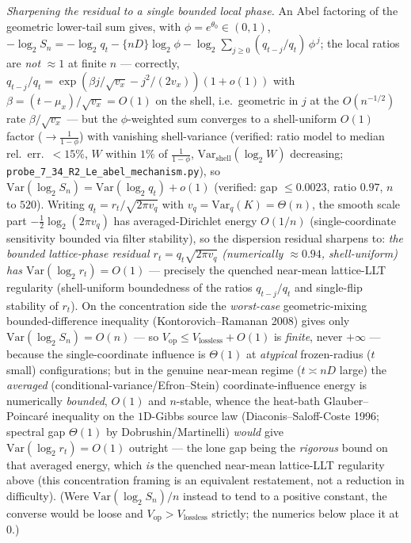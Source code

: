 \documentclass[
]{article}
\begin{document}
\emph{Sharpening the residual to a single bounded local phase.} An Abel factoring of the geometric
lower-tail sum gives, with $\phi=e^{\theta_0}\in(0,1)$,
$-\log_2 S_n=-\log_2 q_t-\{nD\}\log_2\phi-\log_2\!\sum_{j\ge0}(q_{t-j}/q_t)\,\phi^{\,j}$; the local
ratios are \emph{not} $\approx1$ at finite $n$ --- correctly, $q_{t-j}/q_t=\exp(\beta j/\sqrt{v_x}
-j^2/(2v_x))(1+o(1))$ with $\beta=(t-\mu_x)/\sqrt{v_x}=O(1)$ on the shell, i.e.\ geometric in $j$ at the
$O(n^{-1/2})$ rate $\beta/\sqrt{v_x}$ --- but the $\phi$-weighted sum converges to a shell-uniform
$O(1)$ factor ($\to\frac1{1-\phi}$) with vanishing shell-variance (verified: ratio model to
median rel.\ err.\ $<15\%$, $W$ within $1\%$ of $\frac1{1-\phi}$, $\mathrm{Var}_{\mathrm{shell}}(\log_2 W)$
decreasing; \texttt{probe\_7\_34\_R2\_Le\_abel\_mechanism.py}), so
$\mathrm{Var}(\log_2 S_n)=\mathrm{Var}(\log_2 q_t)+o(1)$ (verified: gap $\le0.0023$, ratio $0.97$, $n$
to $520$). Writing $q_t=r_t/\sqrt{2\pi v_q}$
with $v_q=\mathrm{Var}_q(K)=\Theta(n)$, the smooth scale part $-\tfrac12\log_2(2\pi v_q)$ has
averaged-Dirichlet energy $O(1/n)$ (single-coordinate sensitivity bounded via filter stability), so the
dispersion residual sharpens to: \emph{the bounded lattice-phase residual $r_t=q_t\sqrt{2\pi v_q}$
(numerically $\approx0.94$, shell-uniform) has $\mathrm{Var}(\log_2 r_t)=O(1)$} --- precisely the
quenched near-mean lattice-LLT regularity (shell-uniform boundedness of the ratios $q_{t-j}/q_t$ and
single-flip stability of $r_t$). On the concentration side the \emph{worst-case} geometric-mixing
bounded-difference inequality (Kontorovich--Ramanan 2008) gives only $\mathrm{Var}(\log_2 S_n)=O(n)$ ---
so $V_{\mathrm{op}}\le V_{\mathrm{lossless}}+O(1)$ is \emph{finite}, never $+\infty$ --- because the
single-coordinate influence is $\Theta(1)$ at \emph{atypical} frozen-radius ($t$ small) configurations;
but in the genuine near-mean regime ($t\asymp nD$ large) the \emph{averaged}
(conditional-variance/Efron--Stein) coordinate-influence energy is numerically \emph{bounded}, $O(1)$ and
$n$-stable, whence the heat-bath Glauber--Poincar\'e inequality on the $1$D-Gibbs source law
(Diaconis--Saloff-Coste 1996; spectral gap $\Theta(1)$ by Dobrushin/Martinelli) \emph{would} give
$\mathrm{Var}(\log_2 r_t)=O(1)$ outright --- the lone gap being the \emph{rigorous} bound on that
averaged energy, which \emph{is} the quenched near-mean lattice-LLT regularity above (this concentration
framing is an equivalent restatement, not a reduction in difficulty). (Were $\mathrm{Var}(\log_2 S_n)/n$
instead to tend to a positive constant, the converse would be loose and
$V_{\mathrm{op}}>V_{\mathrm{lossless}}$ strictly; the numerics below place it at $0$.)
\end{document}
